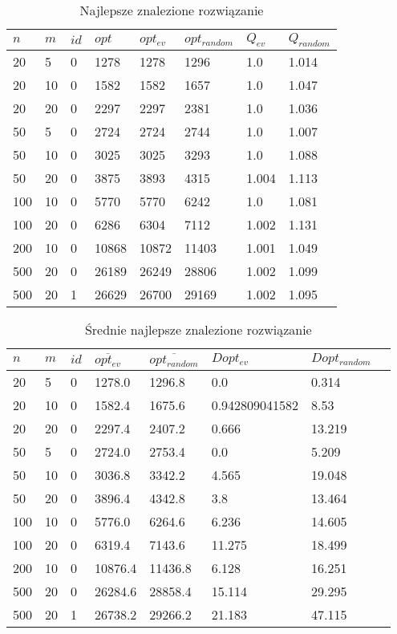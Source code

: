 \documentclass[11pt, a4wide]{article}
\begin{document}
\begin{table}[H]
\caption{Najlepsze znalezione rozwiązanie}
\label{best}
\begin{center}
\begin{tabular}{|l|l|l|l||l|l||l|l|}
  \hline
  $n$ & $m$ & $id$ & $opt$ & $opt_{ev}$ & $opt_{random}$ & $Q_{ev}$ & $Q_{random}$ \\
  \hline
  20 & 5 & 0 & 1278 & 1278 & 1296 & 1.0 & 1.014 \\
  20 & 10 & 0 & 1582 & 1582 & 1657 & 1.0 & 1.047 \\
  20 & 20 & 0 & 2297 & 2297 & 2381 & 1.0 & 1.036 \\
  50 & 5 & 0 & 2724 & 2724 & 2744 & 1.0 & 1.007 \\
  50 & 10 & 0 & 3025 & 3025 & 3293 & 1.0 & 1.088 \\
  50 & 20 & 0 & 3875 & 3893 & 4315 & 1.004 & 1.113 \\
  100 & 10 & 0 & 5770 & 5770 & 6242 & 1.0 & 1.081 \\
  100 & 20 & 0 & 6286 & 6304 & 7112 & 1.002 & 1.131 \\
  200 & 10 & 0 & 10868 & 10872 & 11403 & 1.001 & 1.049 \\
  500 & 20 & 0 & 26189 & 26249 & 28806 & 1.002 & 1.099 \\
  500 & 20 & 1 & 26629 & 26700 & 29169 & 1.002 & 1.095 \\
  \hline
\end{tabular}
\end{center}
\end{table}

\begin{table}[H]
\caption{Średnie najlepsze znalezione rozwiązanie}
\label{mean}
\begin{center}
\begin{tabular}{|l|l|l|l||l|l||l|l|}
  \hline
  $n$ & $m$ & $id$ & $\overline{opt_{ev}}$ & $\overline{opt_{random}}$ & $Dopt_{ev}$ & $Dopt_{random}$ \\
  \hline
  20 & 5 & 0 & 1278.0 & 1296.8 & 0.0 & 0.314 \\
  20 & 10 & 0 & 1582.4 & 1675.6 & 0.942809041582 & 8.53 \\
  20 & 20 & 0 & 2297.4 & 2407.2 & 0.666 & 13.219 \\
  50 & 5 & 0 & 2724.0 & 2753.4 & 0.0 & 5.209 \\
  50 & 10 & 0 & 3036.8 & 3342.2 & 4.565 & 19.048 \\
  50 & 20 & 0 & 3896.4 & 4342.8 & 3.8 & 13.464 \\
  100 & 10 & 0 & 5776.0 & 6264.6 & 6.236 & 14.605 \\
  100 & 20 & 0 & 6319.4 & 7143.6 & 11.275 & 18.499 \\
  200 & 10 & 0 & 10876.4 & 11436.8 & 6.128 & 16.251 \\
  500 & 20 & 0 & 26284.6 & 28858.4 & 15.114 & 29.295 \\
  500 & 20 & 1 & 26738.2 & 29266.2 & 21.183 & 47.115 \\
  \hline
\end{tabular}
\end{center}
\end{table}
\end{document}
